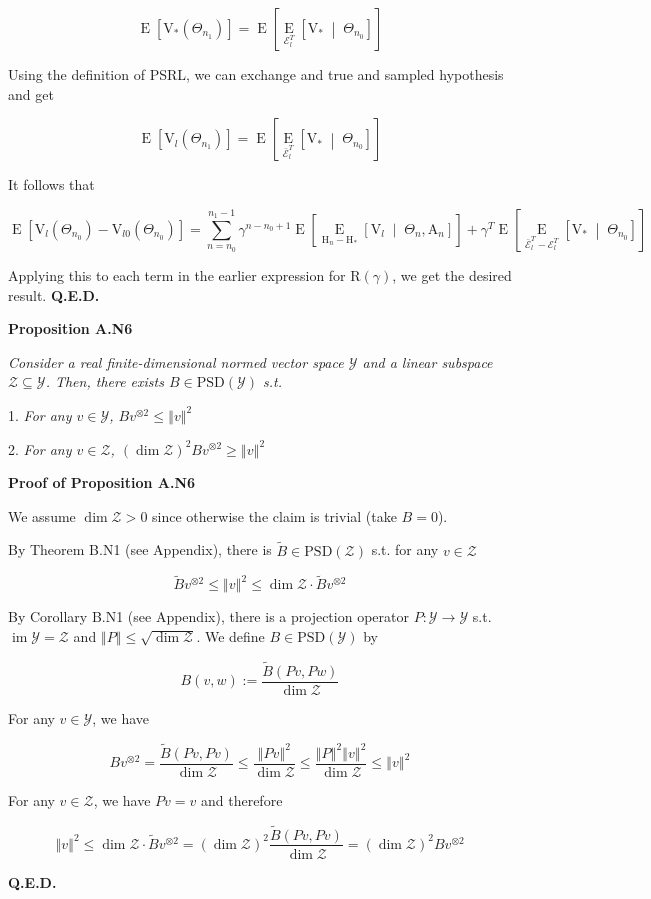 \documentclass[a4paper]{article}
\newcommand{\Co}[1]{}
\newcommand{\AP}[1]{\left(#1\right)}
\newcommand{\AB}[1]{\left[#1\right]}
\newcommand{\ABM}[2]{\left[#1\;\middle\vert\;#2\right]}
\newcommand{\Ea}[2]{\underset{#1}{\operatorname{E}}\AB{#2}}
\newcommand{\CE}[3]{\underset{#1}{\operatorname{E}}\ABM{#2}{#3}}
\newcommand{\PSD}{\mathrm{PSD}}
\DeclareMathOperator{\Img}{im}
\newcommand{\Norm}[1]{\left\Vert #1 \right\Vert}
\newcommand{\B}{B}
\newcommand{\Y}{\mathcal{Y}}
\newcommand{\Z}{\mathcal{Z}}
\newcommand{\V}{\mathrm{V}}
\newcommand{\Reg}{\mathrm{R}}
\newcommand{\AT}{\mathrm{A}}
\newcommand{\THy}{\mathrm{H}_*}
\newcommand{\SHy}{\mathrm{H}}
\newcommand{\Ev}{\mathcal{E}}
\begin{document}
$$\Ea{}{\V_*\AP{\Theta_{n_1}}}=\Ea{}{\CE{\Ev_l^T}{\V_*}{\Theta_{n_0}}}$$

Using the definition of PSRL, we can exchange and true and sampled hypothesis and get

$$\Ea{}{\V_l\AP{\Theta_{n_1}}}=\Ea{}{\CE{\bar{\Ev}_l^T}{\V_*}{\Theta_{n_0}}}$$

It follows that

$$\Ea{}{\V_{l}\AP{\Theta_{n_0}}-\V_{l0}\AP{\Theta_{n_0}}}=\sum_{n=n_0}^{n_1-1}\gamma^{n-n_0+1}\Ea{}{\CE{\SHy_n-\THy}{\V_{l}}{\Theta_n,\AT_n}}+\gamma^T\Ea{}{\CE{\bar{\Ev}_l^T-\Ev_l^T}{\V_*}{\Theta_{n_0}}}$$

Applying this to each term in the earlier expression for $\Reg(\gamma)$, we get the desired result. \textbf{Q.E.D.}\Co{b}

\textbf{Proposition A.N6}\Co{b}

\textit{Consider a real finite-dimensional normed vector space $\Y$ and a linear subspace $\Z\subseteq \Y$. Then, there exists $\B \in\PSD(\Y)$ s.t.}\Co{i}

1. \textit{For any $v\in \Y$, $\B v^{\otimes 2}\leq\Norm{v}^2$}\Co{i}

2. \textit{For any $v\in \Z$, $\AP{\dim{\Z}}^2 \B v^{\otimes 2}\geq \Norm{v}^2$}\Co{i}

\textbf{Proof of Proposition A.N6}\Co{b}

We assume $\dim{\Z}>0$ since otherwise the claim is trivial (take $B=0$).

By Theorem B.N1 (see Appendix), there is $\tilde{B}\in\PSD(\Z)$ s.t. for any $v\in\Z$

$$\tilde{B}v^{\otimes2}\leq\Norm{v}^2\leq\dim{\Z}\cdot\tilde{B}v^{\otimes2}$$

By Corollary B.N1 (see Appendix), there is a projection operator $P:\Y\rightarrow\Y$ s.t. $\Img{\Y}=\Z$ and $\Norm{P}\leq\sqrt{\dim{\Z}}$. We define $B\in\PSD(\Y)$ by

$$B(v,w):=\frac{\tilde{B}\AP{Pv,Pw}}{\dim{\Z}}$$

For any $v\in\Y$, we have

$$Bv^{\otimes2}=\frac{\tilde{B}\AP{Pv,Pv}}{\dim{\Z}}\leq\frac{\Norm{Pv}^2}{\dim{\Z}}\leq\frac{\Norm{P}^2\Norm{v}^2}{\dim{\Z}}\leq\Norm{v}^2$$

For any $v\in\Z$, we have $Pv=v$ and therefore

$$\Norm{v}^2\leq\dim{\Z}\cdot\tilde{B}v^{\otimes2}=\AP{\dim{\Z}}^2\frac{\tilde{B}(Pv,Pv)}{\dim{\Z}}=\AP{\dim{\Z}}^2Bv^{\otimes2}$$
 
\textbf{Q.E.D.}\Co{b}
\end{document}
